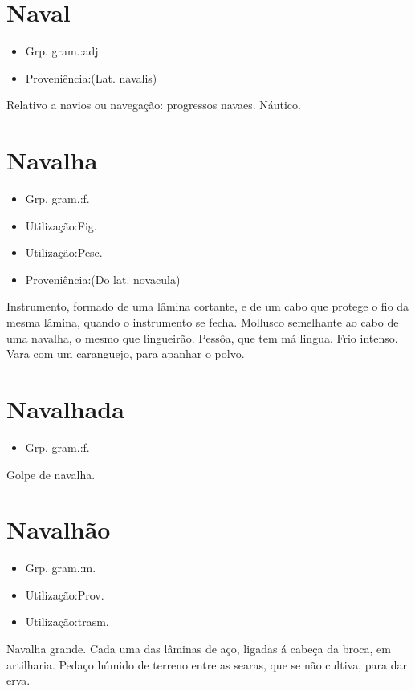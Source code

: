 \section{Naval}
\begin{itemize}
\item {Grp. gram.:adj.}
\end{itemize}
\begin{itemize}
\item {Proveniência:(Lat. \textunderscore navalis\textunderscore )}
\end{itemize}
Relativo a navios ou navegação: \textunderscore progressos navaes\textunderscore .
Náutico.
\section{Navalha}
\begin{itemize}
\item {Grp. gram.:f.}
\end{itemize}
\begin{itemize}
\item {Utilização:Fig.}
\end{itemize}
\begin{itemize}
\item {Utilização:Pesc.}
\end{itemize}
\begin{itemize}
\item {Proveniência:(Do lat. \textunderscore novacula\textunderscore )}
\end{itemize}
Instrumento, formado de uma lâmina cortante, e de um cabo que protege o fio da mesma lâmina, quando o instrumento se fecha.
Mollusco semelhante ao cabo de uma navalha, o mesmo que \textunderscore lingueirão\textunderscore .
Pessôa, que tem má lingua.
Frio intenso.
Vara com um caranguejo, para apanhar o polvo.
\section{Navalhada}
\begin{itemize}
\item {Grp. gram.:f.}
\end{itemize}
Golpe de navalha.
\section{Navalhão}
\begin{itemize}
\item {Grp. gram.:m.}
\end{itemize}
\begin{itemize}
\item {Utilização:Prov.}
\end{itemize}
\begin{itemize}
\item {Utilização:trasm.}
\end{itemize}
Navalha grande.
Cada uma das lâminas de aço, ligadas á cabeça da broca, em artilharia.
Pedaço húmido de terreno entre as searas, que se não cultiva, para dar erva.
